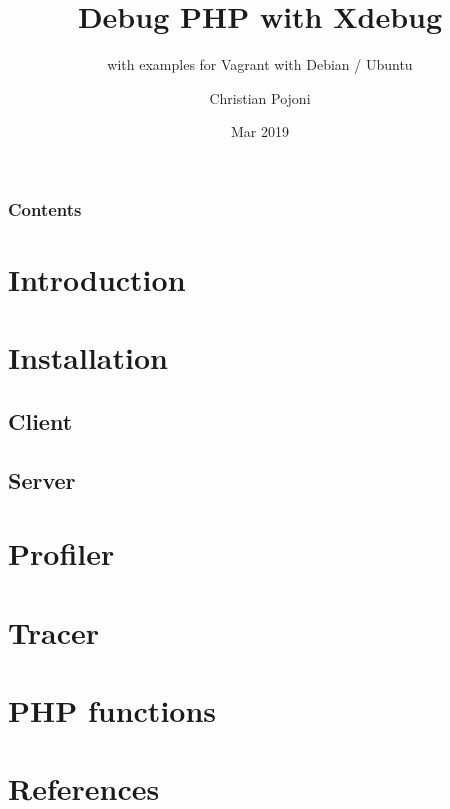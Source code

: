 \documentclass[
    hyperref={bookmarks=true}
]{beamer}
\title{Debug PHP with Xdebug}
\subtitle{with examples for Vagrant with Debian / Ubuntu}
\author{Christian Pojoni}
\institute{\url{www.secret-source.eu}}
\date{Mar 2019}
\begin{document}
\frame{\titlepage}
\begin{frame}\frametitle{Contents}
    \tableofcontents
\end{frame}

\section{Introduction}


\section{Installation} 
\subsection{Client}


\subsection{Server}


\section{Profiler}


\section{Tracer}


\section{PHP functions}


\section{References}

\end{document}
